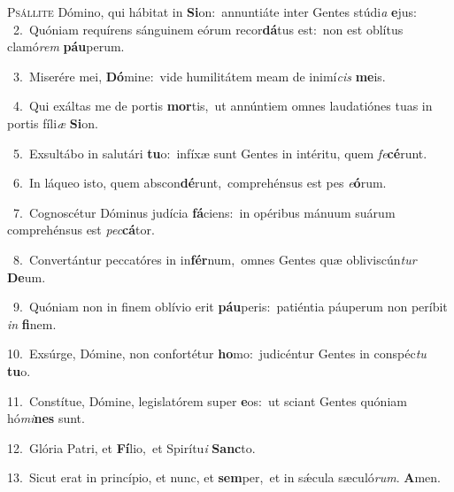 \lettrine{\initial\textcolor{\initialcolor}{P}}{sállite} Dómino, qui hábitat in \textbf{Si}\-on:~\star annuntiáte inter Gentes stúdi\textit{a} \textbf{e}\-jus:\\
{\numbfont\textcolor{\numbcolor}{~2.}}~Quóniam requírens sánguinem eórum recor\-\textbf{dá}\-tus est:~\star non est oblítus clamó\textit{rem} \textbf{páu}\-perum.\par
{\numbfont\textcolor{\numbcolor}{~3.}}~Miserére mei, \textbf{Dó}\-mine:~\star vide humilitátem meam de inimí\textit{cis} \textbf{me}\-is.\par
{\numbfont\textcolor{\numbcolor}{~4.}}~Qui exáltas me de portis \textbf{mor}\-tis,~\star ut annúntiem omnes laudatiónes tuas in portis fíli\textit{æ} \textbf{Si}\-on.\par
{\numbfont\textcolor{\numbcolor}{~5.}}~Exsultábo in salutári \textbf{tu}\-o:~\star infíxæ sunt Gentes in intéritu, quem \textit{fe}\-\textbf{cé}runt.\par
{\numbfont\textcolor{\numbcolor}{~6.}}~In láqueo isto, quem abscon\-\textbf{dé}\-runt,~\star comprehénsus est pes \textit{e}\-\textbf{ó}rum.\par
{\numbfont\textcolor{\numbcolor}{~7.}}~Cognoscétur Dóminus judícia \textbf{fá}\-ciens:~\star in opéribus mánuum suárum comprehénsus est \textit{pec}\-\textbf{cá}tor.\par
{\numbfont\textcolor{\numbcolor}{~8.}}~Convertántur peccatóres in in\-\textbf{fér}\-num,~\star omnes Gentes quæ obliviscún\textit{tur} \textbf{De}\-um.\par
{\numbfont\textcolor{\numbcolor}{~9.}}~Quóniam non in finem oblívio erit \textbf{páu}\-peris:~\star patiéntia páuperum non períbit \textit{in} \textbf{fi}\-nem.\par
{\numbfont\textcolor{\numbcolor}{10.}}~Exsúrge, Dómine, non confortétur \textbf{ho}\-mo:~\star judicéntur Gentes in conspéc\textit{tu} \textbf{tu}\-o.\par
{\numbfont\textcolor{\numbcolor}{11.}}~Constítue, Dómine, legislatórem super \textbf{e}\-os:~\star ut sciant Gentes quóniam hó\-\textit{mi}\-\textbf{nes} sunt.\par
{\numbfont\textcolor{\numbcolor}{12.}}~Glória Patri, et \textbf{Fí}\-lio,~\star et Spirítu\textit{i} \textbf{Sanc}\-to.\par
{\numbfont\textcolor{\numbcolor}{13.}}~Sicut erat in princípio, et nunc, et \textbf{sem}\-per,~\star et in sǽcula sæculó\-\textit{rum}\-. \textbf{A}\-men.\par
